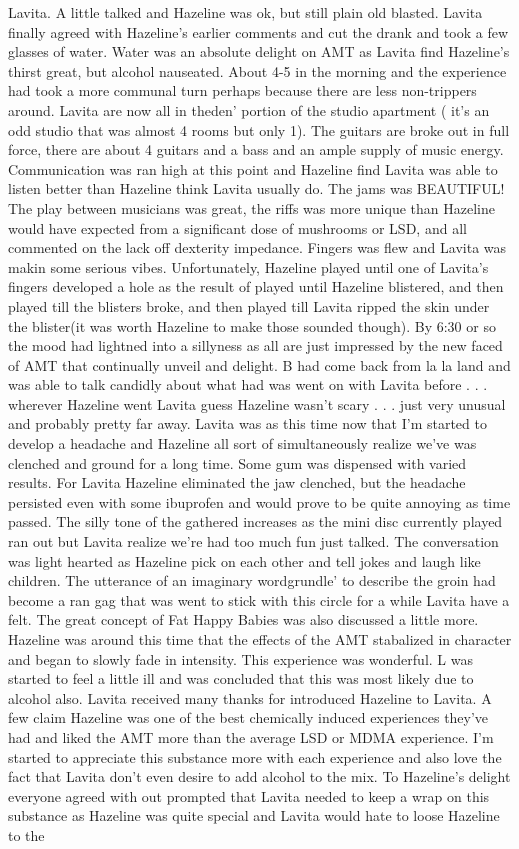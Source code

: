 \documentclass[12pt]{book}
\begin{document}
Lavita. A little talked and Hazeline was ok, but still plain old blasted. Lavita finally agreed with Hazeline's earlier comments and cut the drank and took a few glasses of water. Water was an absolute delight on AMT as Lavita find Hazeline's thirst great, but alcohol nauseated. About 4-5 in the morning and the experience had took a more communal turn perhaps because there are less non-trippers around. Lavita are now all in theden' portion of the studio apartment ( it's an odd studio that was almost 4 rooms but only 1). The guitars are broke out in full force, there are about 4 guitars and a bass and an ample supply of music energy. Communication was ran high at this point and Hazeline find Lavita was able to listen better than Hazeline think Lavita usually do. The jams was BEAUTIFUL! The play between musicians was great, the riffs was more unique than Hazeline would have expected from a significant dose of mushrooms or LSD, and all commented on the lack off dexterity impedance. Fingers was flew and Lavita was makin some serious vibes. Unfortunately, Hazeline played until one of Lavita's fingers developed a hole as the result of played until Hazeline blistered, and then played till the blisters broke, and then played till Lavita ripped the skin under the blister(it was worth Hazeline to make those sounded though). By 6:30 or so the mood had lightned into a sillyness as all are just impressed by the new faced of AMT that continually unveil and delight. B had come back from la la land and was able to talk candidly about what had was went on with Lavita before . . .  wherever Hazeline went Lavita guess Hazeline wasn't scary . . .  just very unusual and probably pretty far away. Lavita was as this time now that I'm started to develop a headache and Hazeline all sort of simultaneously realize we've was clenched and ground for a long time. Some gum was dispensed with varied results. For Lavita Hazeline eliminated the jaw clenched, but the headache persisted even with some ibuprofen and would prove to be quite annoying as time passed. The silly tone of the gathered increases as the mini disc currently played ran out but Lavita realize we're had too much fun just talked. The conversation was light hearted as Hazeline pick on each other and tell jokes and laugh like children. The utterance of an imaginary wordgrundle' to describe the groin had become a ran gag that was went to stick with this circle for a while Lavita have a felt. The great concept of Fat Happy Babies was also discussed a little more. Hazeline was around this time that the effects of the AMT stabalized in character and began to slowly fade in intensity. This experience was wonderful. L was started to feel a little ill and was concluded that this was most likely due to alcohol also. Lavita received many thanks for introduced Hazeline to Lavita. A few claim Hazeline was one of the best chemically induced experiences they've had and liked the AMT more than the average LSD or MDMA experience. I'm started to appreciate this substance more with each experience and also love the fact that Lavita don't even desire to add alcohol to the mix. To Hazeline's delight everyone agreed with out prompted that Lavita needed to keep a wrap on this substance as Hazeline was quite special and Lavita would hate to loose Hazeline to the 
\end{document}
